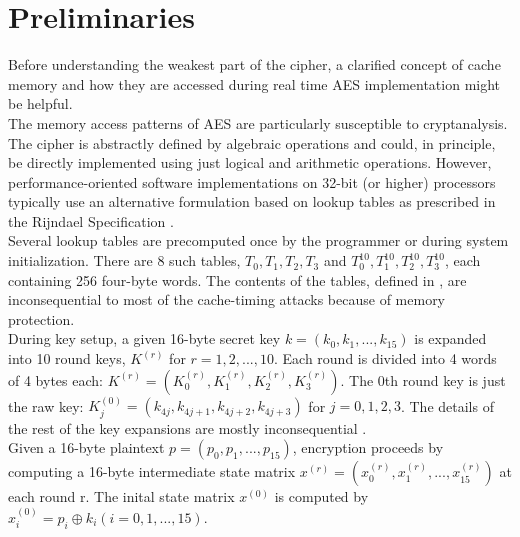 \section{Preliminaries}

Before understanding the weakest part of the cipher, a clarified concept of cache memory and how they are accessed during real time AES implementation might be helpful.\\

The memory access patterns of AES are particularly susceptible to cryptanalysis. The cipher is abstractly defined by algebraic operations and could, in principle, be directly implemented using just logical and arithmetic operations. However, performance-oriented software implementations on 32-bit (or higher) processors typically use an alternative formulation based on lookup tables as prescribed in the Rijndael Specification \citep{daemen2002design}.\\

Several lookup tables are precomputed once by the programmer or during system initialization. There are 8 such tables, $T_0,T_1,T_2,T_3$ and $T_0^{10},T_1^{10},T_2^{10},T_3^{10}$, each containing 256 four-byte words. The contents of the tables, defined in \citep{daemen2002design}, are inconsequential to most of the cache-timing attacks because of memory protection.\\

During key setup, a given 16-byte secret key $k=(k_0,k_1,...,k_{15})$ is expanded into 10 round keys, $K^{(r)}$ for $r=1,2,...,10$. Each round is divided into 4 words of 4 bytes each: $K^{(r)}=(K_0^{(r)},K_1^{(r)},K_2^{(r)},K_3^{(r)})$. The 0th round key is just the raw key: $K_j^{(0)}=(k_{4j},k_{4j+1},k_{4j+2},k_{4j+3})$ for $j=0,1,2,3$. The details of the rest of the key expansions are mostly inconsequential \citep{osvik}.\\

Given a 16-byte plaintext $p=(p_0,p_1,...,p_{15})$, encryption proceeds by computing a 16-byte intermediate state matrix $x^{(r)}=(x_0^{(r)},x_1^{(r)},...,x_{15}^{(r)})$ at each round r. The inital state matrix $x^{(0)}$ is computed by $x_i^{(0)}=p_i \oplus k_i ( i=0,1,...,15 )$.

